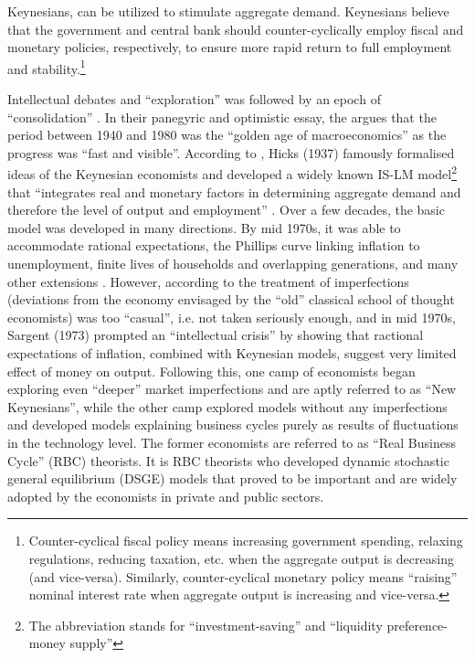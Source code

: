 Keynesians, can be utilized to stimulate aggregate demand. Keynesians believe that the government and central bank should counter-cyclically employ fiscal and monetary policies, respectively, to ensure more rapid return to full employment and stability.\footnote{Counter-cyclical fiscal policy means increasing government spending, relaxing regulations, reducing taxation, etc. when the aggregate output is decreasing (and vice-versa). Similarly, counter-cyclical monetary policy means ``raising'' nominal interest rate when aggregate output is increasing and vice-versa.}

Intellectual debates and ``exploration'' was followed by an epoch of ``consolidation'' \textcite{blanchard_2000_what}. In their panegyric and optimistic essay, the \citereset\textcite{blanchard_2000_what} argues that the period between 1940 and 1980 was the ``golden age of macroeconomics'' \parencite[1379]{blanchard_2000_what} as the progress was ``fast and visible''. According to \textcites[90]{snowdon_1994_a}[1379]{blanchard_2000_what}, Hicks (1937) famously formalised ideas of the Keynesian economists and developed a widely known IS-LM model\footnote{The abbreviation stands for ``investment-saving'' and ``liquidity preference-money supply''} that ``integrates real and monetary factors in determining aggregate demand and therefore the level of output and employment'' \parencite[90]{snowdon_1994_a}. Over a few decades, the basic model was developed in many directions. By mid 1970s, it was able to accommodate rational expectations, the Phillips curve linking inflation to unemployment, finite lives of households and overlapping generations, and many other extensions \parencite[1382]{blanchard_2000_what}. However, according to \citereset\textcite[1382]{blanchard_2000_what} the treatment of imperfections (deviations from the economy envisaged by the ``old'' classical school of thought economists) was too ``casual'', i.e. not taken seriously enough, and in mid 1970s, Sargent (1973) prompted an ``intellectual crisis'' \parencite[1382]{blanchard_2000_what} by showing that ractional expectations of inflation, combined with Keynesian models, suggest very limited effect of money on output. Following this, one camp of economists began exploring even ``deeper'' market imperfections and are aptly referred to as ``New Keynesians'', while the other camp explored models without any imperfections and developed models explaining business cycles purely as results of fluctuations in the technology level. The former economists are referred to as ``Real Business Cycle'' (RBC) theorists. It is RBC theorists who developed dynamic stochastic general equilibrium (DSGE) models that proved to be important and are widely adopted by the economists in private and public sectors. 

